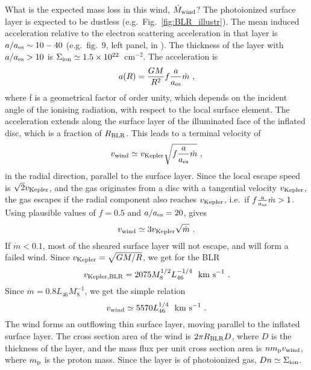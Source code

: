 \documentclass[a4paper,fleqn,usenatbib]{mnras}
\newcommand{\mdot}{\dot{M}}
\newcommand{\cmmt}{cm$^{-2}$}
\begin{document}
What is the expected mass loss in this wind, $\mdot_{\rm wind}$? The photoionized surface layer is expected to
be dustless (e.g.\ Fig.~\ref{fig:BLR_illustr}). The mean induced acceleration relative to the electron scattering acceleration in that layer is $a/a_{\rm es}\sim 10-40$ (e.g.\ fig.~9, left panel, in \citealt*{paperIV}). The thickness of
the layer with $a/a_{\rm es}> 10$ is $\Sigma_{\rm ion}\simeq 1.5\times 10^{22}$~\cmmt. The acceleration is
\begin{equation} 
a(R)=\frac{GM}{R^2}f\frac{a}{a_{\rm es}}\dot{m} \ ,
\end{equation} 
where f is a geometrical factor of order unity, which depends on the incident angle of the ionising radiation,
with respect to the local surface element. The acceleration extends along the surface layer of the illuminated
face of the inflated disc, which is a fraction of $R_{\rm BLR}$. This leads to a terminal velocity of
\begin{equation} 
v_{\rm wind}\simeq v_{\rm Kepler}\sqrt{f\frac{a}{a_{\rm es}}\dot{m}} \ ,
\end{equation} 
in the radial direction, parallel to the surface layer.
Since the local escape speed is $\sqrt{2}v_{\rm Kepler}$, and the gas originates from a disc
with a tangential velocity $v_{\rm Kepler}$, the gas escapes if the radial component also
reaches $v_{\rm Kepler}$, i.e.\ if $f\frac{a}{a_{\rm es}}\dot{m}>1$. Using plausible values of 
$f=0.5$ and $a/a_{\rm es}=20$, gives 
\begin{equation} 
v_{\rm wind}\simeq 3v_{\rm Kepler}\sqrt{\dot{m}}\ .
\end{equation} 
If $\dot{m}<0.1$, most of the sheared surface layer will not escape, and will 
form a failed wind.
Since $v_{\rm Kepler}=\sqrt{GM/R}$, we get for the BLR
\begin{equation} 
v_{\rm Kepler, BLR}=2075M_8^{1/2}L_{46}^{-1/4}~~{\rm km~s}^{-1}\ .
\end{equation} 
Since $\dot{m}=0.8L_{46}M_8^{-1}$, we get the simple relation
\begin{equation} 
v_{\rm wind}\simeq 5570 L_{46}^{1/4}~~{\rm km~s}^{-1}\ . 
\end{equation} 
The wind forms an outflowing thin surface layer, moving parallel to the inflated surface
layer. The cross section area of the wind is $2\pi R_{\rm BLR}D$, where $D$ is the thickness
of the layer, and the mass flux per unit cross section area is $n m_{\rm p} v_{\rm wind}$, 
where $m_{\rm p}$ is the proton mass. Since the layer is of photoionized gas, $Dn\simeq \Sigma_{\rm ion}$.
\end{document}
